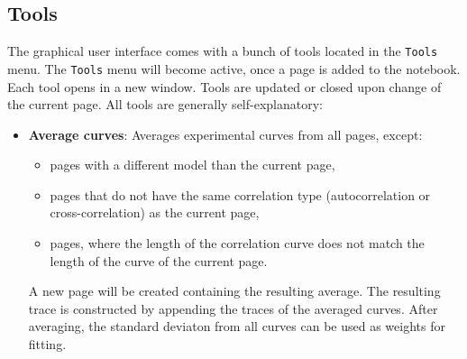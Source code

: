 \subsection{Tools}
\label{sec:tools}
The graphical user interface comes with a bunch of tools located in the \texttt{Tools} menu. The \texttt{Tools} menu will become active, once a page is added to the notebook. Each tool opens in a new window. Tools are updated or closed upon change of the current page. All tools are generally self-explanatory:
\begin{itemize}
\item \textbf{Average curves}: Averages experimental curves from all pages, except:
		\begin{itemize}
		\item pages with a different model than the current page,
		\item pages that do not have the same correlation type (autocorrelation or cross-correlation) as the current page,
		\item pages, where the length of the correlation curve does not match the length of the curve of the current page.
		\end{itemize}
		A new page will be created containing the resulting average. The resulting trace is constructed by appending the traces of the averaged curves. After averaging, the standard deviaton from all curves can be used as weights for fitting.
		

\end{itemize}

